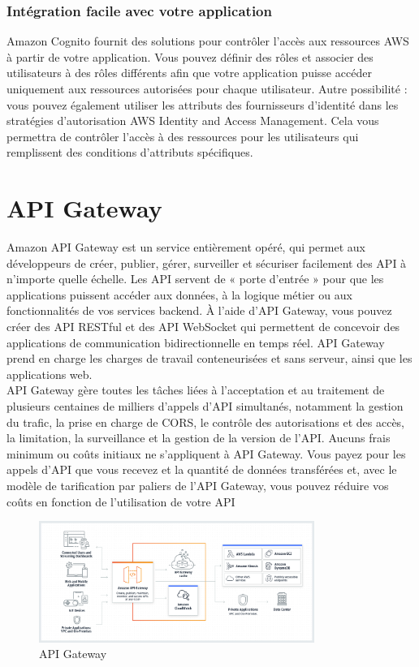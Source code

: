 \subsubsection{Intégration facile avec votre application}
Amazon Cognito fournit des solutions pour contrôler l’accès aux ressources AWS à partir de votre application. Vous pouvez définir des rôles et associer des utilisateurs à des rôles différents afin que votre
application puisse accéder uniquement aux ressources autorisées pour chaque utilisateur. Autre possibilité
: vous pouvez également utiliser les attributs des fournisseurs d’identité dans les stratégies d’autorisation
AWS Identity and Access Management. Cela vous permettra de contrôler l’accès à des ressources pour les
utilisateurs qui remplissent des conditions d’attributs spécifiques.


\section{API Gateway}

Amazon API Gateway est un service entièrement opéré, qui permet aux développeurs de créer, publier,
gérer, surveiller et sécuriser facilement des API à n’importe quelle échelle. Les API servent de « porte
d’entrée » pour que les applications puissent accéder aux données, à la logique métier ou aux fonctionnalités de vos services backend. À l’aide d’API Gateway, vous pouvez créer des API RESTful et des API
WebSocket qui permettent de concevoir des applications de communication bidirectionnelle en temps réel.
API Gateway prend en charge les charges de travail conteneurisées et sans serveur, ainsi que les applications
web.\\
API Gateway gère toutes les tâches liées à l’acceptation et au traitement de plusieurs centaines de milliers
d’appels d’API simultanés, notamment la gestion du trafic, la prise en charge de CORS, le contrôle des
autorisations et des accès, la limitation, la surveillance et la gestion de la version de l’API. Aucuns frais
minimum ou coûts initiaux ne s’appliquent à API Gateway. Vous payez pour les appels d’API que vous
recevez et la quantité de données transférées et, avec le modèle de tarification par paliers de l’API Gateway,
vous pouvez réduire vos coûts en fonction de l’utilisation de votre API

 \begin{figure}[!th]
            \centering
                \includegraphics[width=0.8\textwidth]{Figures/apigateway}
	       \decoRule
		\caption[API Gateway]{API Gateway}
	\label{fig:apigateway}
	\end{figure}

